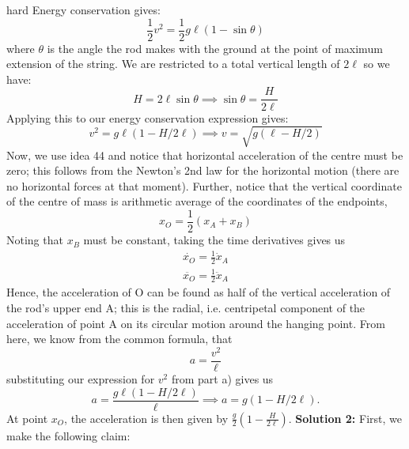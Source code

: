 \begin{solution}{hard}
Energy conservation gives:
$$\frac{1}{2}v^2=\frac{1}{2}g\ell(1-\sin\theta)$$
where $\theta$ is the angle the rod makes with the ground at the point of maximum extension of the string. We are restricted to a total vertical length of $2\ell$ so we have:
$$H=2\ell\sin\theta \implies \sin\theta = \frac{H}{2\ell}$$
Applying this to our energy conservation expression gives:
$$v^2 = g\ell(1-H/2\ell) \implies \boxed{v=\sqrt{g(\ell-H/2)}}$$
Now, we use idea 44 and notice that horizontal acceleration of the centre must be zero; this follows from the Newton’s 2nd law for the horizontal motion (there are no horizontal forces at that moment). Further, notice that the vertical coordinate of the centre of mass is arithmetic average of the coordinates of the endpoints,
\[x_O = \frac{1}{2}(x_A + x_B)\]
Noting that $x_B$ must be constant, taking the time derivatives gives us 
\begin{align*}
\dot{x_O} = \frac{1}{2}\dot{x}_A\\
\ddot{x_O} = \frac{1}{2}\ddot{x}_A
\end{align*}
Hence, the acceleration of O can be found as half of the vertical acceleration of the rod’s upper end A; this is the radial, i.e. centripetal component of the acceleration of point A on its circular motion around the hanging point. From here, we know from the common formula, that 
\[a = \frac{v^2}{\ell}\]
substituting our expression for $v^2$ from part a) gives us 
\[a = \frac{g\ell(1-H/2\ell)}{\ell} \implies a = g(1 - H/2\ell).\]
At point $x_O$, the acceleration is then given by $\boxed{\frac{g}{2}\left(1 - \frac{H}{2\ell}\right)}$.
\tcbline
\textbf{Solution 2:} First, we make the following claim:
\vspace{2mm}


\end{solution}
